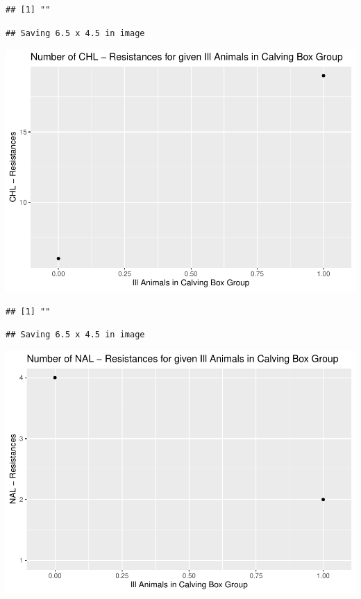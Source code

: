 \documentclass[
]{article}
\begin{document}
\begin{verbatim}
## [1] ""
\end{verbatim}

\begin{verbatim}
## Saving 6.5 x 4.5 in image
\end{verbatim}

\includegraphics{NResistenzen_files/figure-latex/binary_or_nominal_variables-26.pdf}

\begin{verbatim}
## [1] ""
\end{verbatim}

\begin{verbatim}
## Saving 6.5 x 4.5 in image
\end{verbatim}

\includegraphics{NResistenzen_files/figure-latex/binary_or_nominal_variables-27.pdf}
\end{document}
